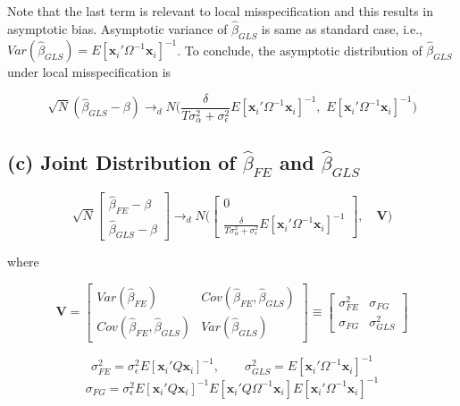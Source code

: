 \documentclass[12pt]{article}
\begin{document}
Note that the last term is relevant to local misspecification and this results in asymptotic bias. Asymptotic variance of $\widehat{\beta}_{GLS}$ is same as standard case, i.e., $Var(\widehat{\beta}_{GLS}) = E[\mathbf{x}_i' \Omega^{-1} \mathbf{x}_i]^{-1}$. To conclude, the asymptotic distribution of $\widehat{\beta}_{GLS}$ under local misspecification is

\[
\sqrt{N} (\widehat{\beta}_{GLS}-\beta) \rightarrow_{d} N\big( \frac{\delta}{T\sigma_\alpha^2 + \sigma_\epsilon^2}  E[\mathbf{x}_i' \Omega^{-1} \mathbf{x}_i]^{-1},\,\, E[\mathbf{x}_i' \Omega^{-1} \mathbf{x}_i]^{-1}\big)
\]

\vspace{0.2in}


\subsection*{(c) Joint Distribution of $\widehat{\beta}_{FE}$ and $\widehat{\beta}_{GLS}$}

\vspace{0.2in}

\[
\sqrt{N}\begin{bmatrix}
\widehat{\beta}_{FE}-\beta\\
\widehat{\beta}_{GLS}-\beta
\end{bmatrix} \rightarrow_d 
N \bigg(
\begin{bmatrix}
0\\
\frac{\delta}{T\sigma_\alpha^2 + \sigma_\epsilon^2} E[\mathbf{x}_i' \Omega^{-1} \mathbf{x}_i]^{-1}
\end{bmatrix}, \quad \mathbf{V}
\bigg)
\]

where 

\[
\mathbf{V} = \begin{bmatrix}
Var(\widehat{\beta}_{FE}) & Cov(\widehat{\beta}_{FE}, \widehat{\beta}_{GLS})\\
Cov(\widehat{\beta}_{FE}, \widehat{\beta}_{GLS}) &Var(\widehat{\beta}_{GLS})
\end{bmatrix} \equiv
\begin{bmatrix}
\sigma_{FE}^2 & \sigma_{FG}\\
\sigma_{FG} &\sigma_{GLS}^2
\end{bmatrix} 
\]

\[
\sigma_{FE}^2 = \sigma_\epsilon^2 E[\mathbf{x}_i' Q \mathbf{x}_i]^{-1}, \qquad \sigma_{GLS}^2 = E[\mathbf{x}_i' \Omega^{-1} \mathbf{x}_i]^{-1}
\]
\[
\sigma_{FG} = \sigma_{\epsilon}^2 E[\mathbf{x}_i' Q \mathbf{x}_i]^{-1} E[\mathbf{x}_i' Q\Omega^{-1} \mathbf{x}_i] E[\mathbf{x}_i' \Omega^{-1} \mathbf{x}_i]^{-1}
\]
\end{document}

